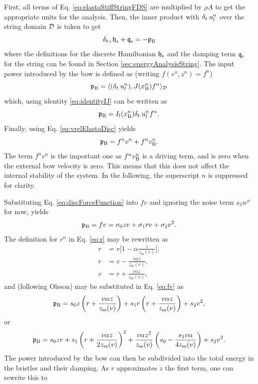 First, all terms of Eq. \eqref{eq:elastoStiffStringFDS} are multiplied by $\rho A$ to get the appropriate units for the analysis. Then, the inner product with $\delta_{t\cdot} u_l^n$ over the string domain $\mathcal{D}$ is taken to get
\begin{equation}
    \delta_{t+} \mathfrak{h}_\text{s} + \mathfrak{q}_\text{s} = -\mathfrak{p}_{\text{B}}
\end{equation}
where the definitions for the discrete Hamiltonian $\mathfrak{h}_\text{s}$ and the damping term $\mathfrak{q}_\text{s}$ for the string can be found in Section \ref{sec:energyAnalysisString}. The input power introduced by the bow is defined as (writing $f(v^n,z^n) = f^n$)
\begin{equation*}
    \mathfrak{p}_{\text{B}} = \langle (\delta_{t\cdot} u_l^n), J(x_{\text{B}}^n)f^n\rangle_{\mathcal{D}}
\end{equation*}
which, using identity \eqref{eq:identityIJ} can be written as 
\begin{equation*}
    \mathfrak{p}_{\text{B}} = I_l(x_\text{B}^n)\delta_{t\cdot} u_l^n f^n.
\end{equation*}
Finally, using Eq. \eqref{eq:vrelElastoDisc} yields
\begin{equation}
    \mathfrak{p}_{\text{B}} = f^nv^n + f^n v_{\text{B}}^n.
\end{equation}
The term $f^nv^n$ is the important one as $f^nv_{\text{B}}^n$ is a driving term, and is zero when the external bow velocity is zero. This means that this does not affect the internal stability of the system. In the following, the superscript $n$ is suppressed for clarity.

Substituting Eq. \eqref{eq:discForceFunction} into $fv$ and ignoring the noise term $s_3w^n$ for now, yields
\begin{equation}\label{eq:fv}
    \mathfrak{p}_{\text{B}} = fv = \sigma_{0}zv +\sigma_{1}rv+\sigma_{2}v^2.
\end{equation}
The definition for $r^n$ in Eq. \eqref{eq:r} may be rewritten as
\begin{equation*}
    \begin{aligned}
        r &= v\bigg[1-\alpha\frac{z}{z_\text{ss}(v)}\bigg],\\
        r &= v-\frac{v\alpha z}{z_\text{ss}(v)},\\
        v &= r + \frac{v\alpha z}{z_\text{ss}(v)},
    \end{aligned}
\end{equation*}
and (following Olsson) may be substituted in Eq. \eqref{eq:fv} as
\begin{equation}
    \mathfrak{p}_{\text{B}} = s_{0}z\left(r+ \frac{v\alpha z}{z_\text{ss}(v)}\right)+s_{1}r\left(r+ \frac{v\alpha z}{z_\text{ss}(v)}\right)+s_{2}v^2,
\end{equation}
or
\begin{equation}
    \mathfrak{p}_{\text{B}} = s_0zr+s_1\left(r+\frac{v\alpha z}{2z_\text{ss}(v)}\right)^2+\frac{v\alpha z^2}{z_\text{ss}(v)}\left(s_0-\frac{s_1v\alpha}{4z_\text{ss}(v)}\right)+s_2v^2.
\end{equation}
The power introduced by the bow can then be subdivided into the total energy in the bristles and their damping. As $r$ approximates $\dot z$ the first term, one can rewrite this to 

